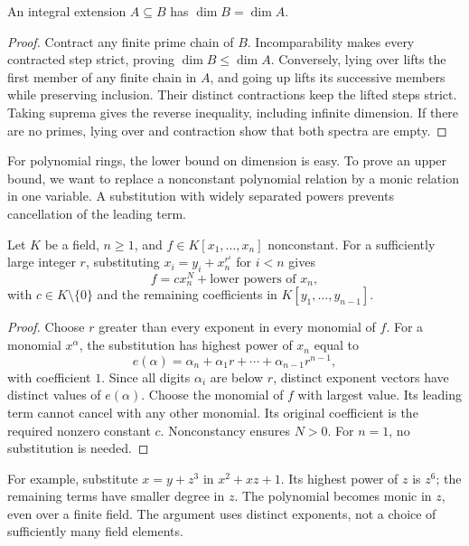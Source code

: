 \begin{corollary}\label{cor:dimintegral}
An integral extension $A\subseteq B$ has $\dim B=\dim A$.
\end{corollary}

\begin{proof}
Contract any finite prime chain of $B$. Incomparability makes every contracted step strict, proving $\dim B\le\dim A$. Conversely, lying over lifts the first member of any finite chain in $A$, and going up lifts its successive members while preserving inclusion. Their distinct contractions keep the lifted steps strict. Taking suprema gives the reverse inequality, including infinite dimension. If there are no primes, lying over and contraction show that both spectra are empty.
\end{proof}

For polynomial rings, the lower bound on dimension is easy. To prove an upper bound, we want to replace a nonconstant polynomial relation by a monic relation in one variable. A substitution with widely separated powers prevents cancellation of the leading term.

\begin{lemma}\label{lem:noethervar}
Let $K$ be a field, $n\ge1$, and $f\in K[x_1,\ldots,x_n]$ nonconstant. For a sufficiently large integer $r$, substituting $x_i=y_i+x_n^{r^i}$ for $i<n$ gives
\[
 f=cx_n^N+\text{lower powers of }x_n,
\]
with $c\in K\setminus\{0\}$ and the remaining coefficients in $K[y_1,\ldots,y_{n-1}]$.
\end{lemma}

\begin{proof}
Choose $r$ greater than every exponent in every monomial of $f$. For a monomial $x^\alpha$, the substitution has highest power of $x_n$ equal to
\[
 e(\alpha)=\alpha_n+\alpha_1r+\cdots+\alpha_{n-1}r^{n-1},
\]
with coefficient $1$. Since all digits $\alpha_i$ are below $r$, distinct exponent vectors have distinct values of $e(\alpha)$. Choose the monomial of $f$ with largest value. Its leading term cannot cancel with any other monomial. Its original coefficient is the required nonzero constant $c$. Nonconstancy ensures $N>0$. For $n=1$, no substitution is needed.
\end{proof}

For example, substitute $x=y+z^3$ in $x^2+xz+1$. Its highest power of $z$ is $z^6$; the remaining terms have smaller degree in $z$. The polynomial becomes monic in $z$, even over a finite field. The argument uses distinct exponents, not a choice of sufficiently many field elements.

